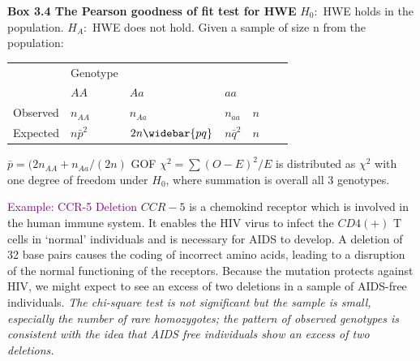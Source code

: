 \documentclass[a4paper,twoside,11pt]{article}
\begin{document}
\begin{shaded*}
\noindent \textbf{Box 3.4 The Pearson goodness of fit test for HWE}
\newline
\newline
$H_0:$ HWE holds in the population.
\newline
$H_A:$ HWE does not hold.
\newline
\newline
Given a sample of size n from the population:
\begin{center}
\centering
\begin{tabularx}{1.0\textwidth} { 
  | >{\centeringt\arraybackslash}X 
   >{\centering\arraybackslash}X
   >{\centering\arraybackslash}X
   >{\centering\arraybackslash}X 
   >{\centering\arraybackslash}X
  | >{\centering\arraybackslash}X 
  | >{\centering\arraybackslash}X | }
\hline
 \ & Genotype & \ & \ & \ \\

 \ & $AA$ & $Aa$ & $ aa$ & \ \\
\hline
Observed & $n_{AA}$ & $n_{Aa}$ & $n_{aa}$ & $n$ \\
Expected & $n \bar{p}^2$ & $2n \widebar{pq}$ & $n \bar{q}^2$ & $n$ \\
\hline
\end{tabularx}
\end{center}
$\bar{p}=(2n_{AA} + n_{Aa}/(2n)$
\newline
GOF $\chi^2 = \sum (O-E)^2/E$ is distributed as $\chi^2$ with one degree of freedom under $H_0$, where summation is overall all $3$ genotypes.
\end{shaded*}
\textcolor{Purple}{Example: CCR-5 Deletion} 
\newline
\newline
$CCR-5$ is a chemokind receptor which is involved in the human immune system. It enables the HIV virus to infect the $CD4(+)$ T cells in ‘normal’ individuals and is necessary for AIDS to develop. A deletion of 32 base pairs causes the coding of incorrect amino acids, leading to a disruption of the normal functioning of the receptors. Because the mutation protects against HIV, we might expect to see an excess of two deletions in a sample of AIDS-free individuals.
\newline
\newline
\textcolor{NavyBlue}{\textit{The chi-square test is not significant but the sample is small, especially the number of rare homozygotes; the pattern of observed genotypes is consistent with the idea that AIDS free individuals show an excess of two deletions.}}
\end{document}
